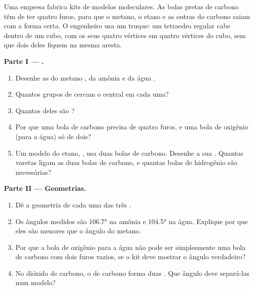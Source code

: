 \begin{problem}
\label{pb:g10:lewis-and-shape:1}
Uma empresa fabrica kits de modelos moleculares. As bolas pretas de
carbono têm de ter quatro furos, para que o metano, o etano e as outras
 do carbono saiam com a forma certa. O engenheiro usa um
truque: um tetraedro regular cabe dentro de um cubo, com os seus quatro
vértices em quatro vértices do cubo, sem que dois deles fiquem na mesma
aresta.

\medskip
\noindent\textbf{Parte I --- .}
\begin{enumerate}
  \item Desenhe as  do metano , da amônia
         e da água .
  \item Quantos grupos de  cercam o  central em cada uma?
  \item Quantos deles são ?
  \item Por que uma bola de carbono precisa de quatro furos, e uma bola
        de oxigênio (para a água) só de dois?
  \item Um modelo do etano, , usa duas bolas de carbono.
        Desenhe a sua . Quantas varetas ligam as duas
        bolas de carbono, e quantas bolas de hidrogênio são necessárias?
\end{enumerate}

\medskip
\noindent\textbf{Parte II --- Geometrias.}
\begin{enumerate}[resume]
  \item Dê a geometria de cada uma das três .
  \item Os ângulos medidos são \ang{106.7} na amônia e \ang{104.5} na
        água. Explique por que eles são menores que o ângulo do metano.
  \item Por que a bola de oxigênio para a água não pode ser simplesmente
        uma bola de carbono com dois furos vazios, se o kit deve mostrar
        o ângulo verdadeiro?
  \item No dióxido de carbono, o  de carbono forma duas . Que ângulo deve separá-las num modelo?
\end{enumerate}


\end{problem}
